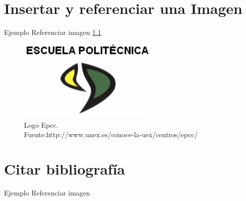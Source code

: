 \documentclass[12pt,a4paper,twoside]{article} %
\begin{document}
\chapter{\textbf{Insertar y referenciar una Imagen\\}}
Ejemplo Referenciar imagen \ref{fig:logoEpcc}
\begin{figure}[H]
\centering
\includegraphics[width=0.6\textwidth]{pictures/logoEpcc.png}
\caption[Logo Epcc]{Logo Epcc.\\Fuente:http://www.unex.es/conoce-la-uex/centros/epcc/}
\label{fig:logoEpcc}
\end{figure}


\chapter{\textbf{Citar bibliografía\\}}

Ejemplo Referenciar imagen \cite{haut2016cloud}

\pagebreak
\thispagestyle{empty}
\pagestyle{empty}

%

\end{document}
